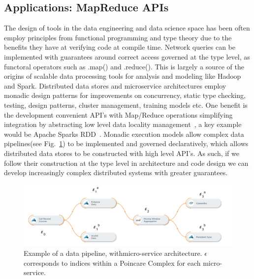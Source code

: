 \documentclass[runningheads]{llncs}
\begin{document}
\subsection{Applications: MapReduce APIs}
The design of tools in the data engineering and data science space has been often employ principles from functional programming and type theory due to the benefits they have at verifying code at compile time. Network queries can be implemented with guarantees around correct access governed at the type level, as functoral operators such as .map() and .reduce(). This is largely a source of the origins of scalable data processing tools for analysis and modeling like Hadoop and Spark. Distributed data stores and microservice architectures employ monadic design patterns for improvements on concurrency, static type checking, testing, design patterns, cluster management, training models etc. One benefit is the development convenient API's with Map/Reduce operations simplifying integration by abstracting low level data locality management~\cite{ref_book2}, a key example would be Apache Sparks RDD~\cite{ref_url1}. Monadic execution models allow complex data pipelines(see Fig.~\ref{fig3}) to be implemented and governed declaratively, which allows distributed data stores to be constructed with high level API's. As such, if we follow their construction at the type level in architecture and code design we can develop increasingly complex distributed systems with greater guarantees.
\begin{figure}
\includegraphics[width=\textwidth]{data-pipeline.png}
\caption{Example of a data pipeline, withmicro-service architecture. $\epsilon$ corresponds to indices within a Poincare Complex for each micro-service.} \label{fig3}
\end{figure}
\end{document}
